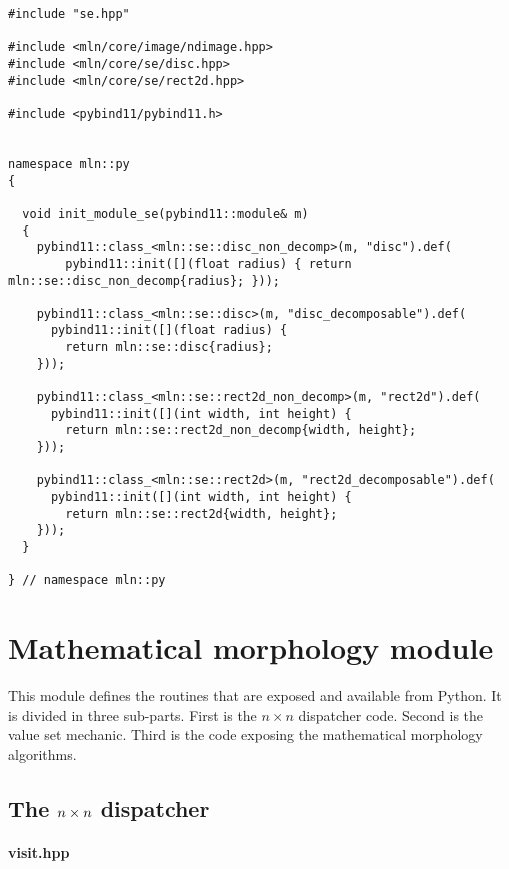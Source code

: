 \begin{verbatim}
#include "se.hpp"

#include <mln/core/image/ndimage.hpp>
#include <mln/core/se/disc.hpp>
#include <mln/core/se/rect2d.hpp>

#include <pybind11/pybind11.h>


namespace mln::py
{

  void init_module_se(pybind11::module& m)
  {
    pybind11::class_<mln::se::disc_non_decomp>(m, "disc").def(
        pybind11::init([](float radius) { return mln::se::disc_non_decomp{radius}; }));

    pybind11::class_<mln::se::disc>(m, "disc_decomposable").def(
      pybind11::init([](float radius) {
        return mln::se::disc{radius};
    }));

    pybind11::class_<mln::se::rect2d_non_decomp>(m, "rect2d").def(
      pybind11::init([](int width, int height) {
        return mln::se::rect2d_non_decomp{width, height};
    }));

    pybind11::class_<mln::se::rect2d>(m, "rect2d_decomposable").def(
      pybind11::init([](int width, int height) {
        return mln::se::rect2d{width, height};
    }));
  }

} // namespace mln::py
\end{verbatim}


\clearpage

\section{Mathematical morphology module}
\label{appendix:static-dynamic-bridge.mm}

This module defines the routines that are exposed and available from Python. It is divided in three sub-parts. First is
the \(n \times n\) dispatcher code. Second is the value set mechanic. Third is the code exposing the mathematical
morphology algorithms.

\subsection{The \(\protect n \times n\) dispatcher}
\label{appendix:static-dynamic-bridge.mm.nndispatcher}

\paragraph{visit.hpp}
\label{appendix:static-dynamic-bridge.mm.nndispatcher.visit.hpp}

